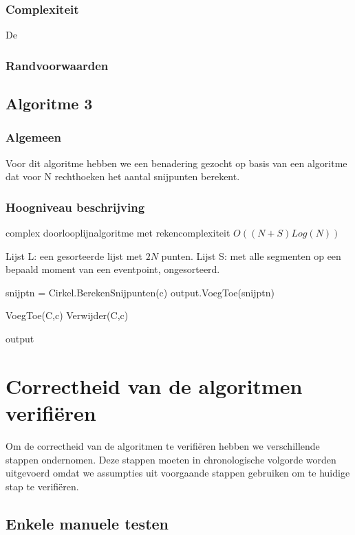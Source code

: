 \documentclass[11pt,a4paper]{article}
\begin{document}
\subsubsection{Complexiteit}
De
\subsubsection{Randvoorwaarden}
\subsection{Algoritme 3}
\subsubsection{Algemeen}
Voor dit algoritme hebben we een benadering gezocht op basis van een algoritme dat voor N rechthoeken het aantal snijpunten berekent.
\subsubsection{Hoogniveau beschrijving}
\begin{algorithm}
\caption{complex doorlooplijnalgoritme met rekencomplexiteit $O((N+S)Log(N))$}
\begin{algorithmic}
\State Lijst L: een gesorteerde lijst met $2N$ punten.
\State Lijst S: met alle segmenten op een bepaald moment van een eventpoint, ongesorteerd.

\State snijptn = Cirkel.BerekenSnijpunten(c)
\State output.VoegToe(snijptn)

\State VoegToe(C,c)
\EndIf
{}
\State Verwijder(C,c)
\EndIf
\EndFor

\Return output
\end{algorithmic}
\end{algorithm}

\section{Correctheid van de algoritmen verifi\"eren}

Om de correctheid van de algoritmen te verifi\"eren hebben we verschillende stappen ondernomen. Deze stappen moeten in chronologische volgorde worden uitgevoerd omdat we assumpties uit voorgaande stappen gebruiken om te huidige stap te verifi\"eren.

\subsection{Enkele manuele testen}
\end{document}
